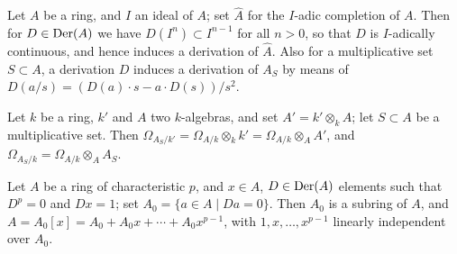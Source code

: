 \begin{exercise}\label{ex:25.3-ex}
Let $A$ be a ring, and $I$ an ideal of $A$; set $\hat{A}$ for the $I$-adic completion of
$A$. Then for $D \in \operatorname{Der}(A)$ we have $D(I^n) \subset I^{n-1}$ for all $n > 0$, so that $D$
is $I$-adically continuous, and hence induces a derivation of $\hat{A}$. Also for a
multiplicative set $S \subset A$, a derivation $D$ induces a derivation of $A_S$ by
means of $D(a/s) = (D(a) \cdot s - a \cdot D(s))/s^2$.
\end{exercise}

\begin{exercise}\label{ex:25.4-ex}
Let $k$ be a ring, $k'$ and $A$ two $k$-algebras, and set $A' = k' \otimes_k A$; let
$S \subset A$ be a multiplicative set. Then $\Omega_{A_S/k'} = \Omega_{A/k} \otimes_k k' =
\Omega_{A/k} \otimes_A A'$, and $\Omega_{A_S/k} = \Omega_{A/k} \otimes_A A_S$.
\end{exercise}

\begin{exercise}\label{ex:25.5-ex}
Let $A$ be a ring of characteristic $p$, and $x \in A$, $D \in \operatorname{Der}(A)$ elements such
that $D^p = 0$ and $Dx = 1$; set $A_0 = \{a \in A \mid Da = 0\}$. Then $A_0$ is a subring of
$A$, and $A = A_0[x] = A_0 + A_0x + \cdots + A_0x^{p-1}$, with $1, x, \ldots, x^{p-1}$ linearly
independent over $A_0$.
\end{exercise}
